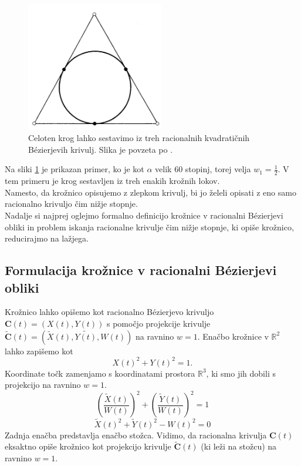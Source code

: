 \documentclass[a4paper,11pt]{article}
\theoremstyle{definition}
\theoremstyle{plain}
\begin{document}
\begin{figure}[ht!]
    \centering
    \includegraphics[width=60mm]{krog_po_delih.png}
    \caption{Celoten krog lahko sestavimo iz treh racionalnih kvadratičnih B\'ezierjevih krivulj. Slika je povzeta po \cite{farin}.}
    \label{slika:krogpodelih}
\end{figure}
\noindent
Na sliki \ref{slika:krogpodelih} je prikazan primer, ko je kot $\alpha$ velik 60 stopinj, torej velja $w_1 = \frac{1}{2}$. V tem primeru je krog sestavljen iz treh enakih krožnih lokov.
\\

Namesto, da krožnico opisujemo z zlepkom krivulj, bi jo želeli opisati z eno samo racionalno krivuljo čim nižje stopnje.
\\
Nadalje si najprej oglejmo formalno definicijo krožnice v racionalni B\'ezierjevi obliki in problem iskanja racionalne krivulje čim nižje stopnje, ki opiše krožnico, reducirajmo na lažjega.

\subsection{Formulacija krožnice v racionalni B\'ezierjevi obliki}
Krožnico lahko opišemo kot racionalno B\'ezierjevo krivuljo $\boldsymbol{C}(t)=(X(t),Y(t))$ s pomočjo projekcije krivulje $\boldsymbol{\tilde{C}}(t)=(\tilde{X}(t), \tilde{Y(t)}, W(t))$ na ravnino $w=1$. 
Enačbo krožnice v $\mathbb{R}^2$ lahko zapišemo kot
$$X(t)^2+Y(t)^2=1.$$
Koordinate točk zamenjamo s koordinatami prostora $\mathbb{R}^3$, ki smo jih dobili s projekcijo na ravnino $w=1$.
$$\left(\frac{\tilde{X}(t)}{W(t)}\right)^2+\left(\frac{\tilde{Y}(t)}{W(t)}\right)^2=1$$
$$\tilde{X}(t)^2+\tilde{Y}(t)^2-W(t)^2=0$$
Zadnja enačba predstavlja enačbo stožca. Vidimo, da racionalna krivulja $\boldsymbol{C}(t)$ eksaktno opiše krožnico kot projekcijo krivulje $\boldsymbol{\tilde{C}}(t)$ (ki leži na stožcu) na ravnino $w = 1$.
\end{document}
